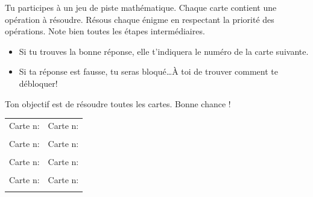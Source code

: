 

\setcounter{Exercice}{0}

Tu participes à un jeu de piste mathématique. Chaque carte contient une opération à résoudre. Résous chaque énigme en respectant la priorité des opérations. Note bien toutes les étapes intermédiaires.

\begin{itemize}[label=$\diamondsuit$]
\item Si tu trouves la bonne réponse, elle t'indiquera le numéro de la carte suivante.
\item Si ta réponse est fausse, tu seras bloqué\ldots À toi de trouver comment te débloquer!
\end{itemize}

Ton objectif est de résoudre toutes les cartes. Bonne chance !

\vfill
\def\arraystretch{4}
\begin{tabularx}{\linewidth}{|X|X|}
\hline
  Carte n\textdegree{}:&Carte n\textdegree{}:\\
  &\\
\hline
  Carte n\textdegree{}:&Carte n\textdegree{}:\\
  &\\
\hline
  Carte n\textdegree{}:&Carte n\textdegree{}:\\
  &\\
\hline
  Carte n\textdegree{}:&Carte n\textdegree{}:\\
  &\\
\hline
\end{tabularx}
\def\arraystretch{1}
